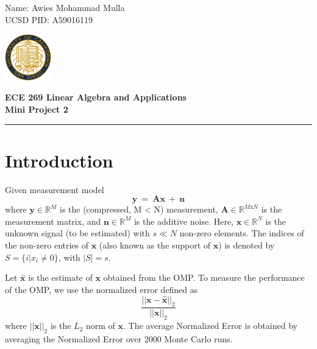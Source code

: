 \documentclass[11pt,letterpaper]{article}
\begin{document}
\pagestyle{plain}

\begin{flushleft}
Name: Awies Mohammad Mulla\\
UCSD PID: A59016119
\end{flushleft}

\begin{flushright}\vspace{-15mm}
\includegraphics[height=2cm]{logo.png}
\end{flushright}
 
\begin{center}\vspace{-1cm}
\textbf{\large ECE 269 Linear Algebra and Applications}\\
\textbf{\large Mini Project 2}\\
\end{center}

 
\rule{\linewidth}{0.1mm}

\bigskip
\bigskip

\section{Introduction}
Given measurement model
$$
\mathbf{y} \ = \ \mathbf{Ax} \ + \ \mathbf{n}
$$
where $ \mathbf{y} \in \mathbb{R}^{M}$ is the (compressed, M < N) measurement, $ \mathbf{A} \in \mathbb{R}^{M \text{x} N}$ is the measurement matrix, and $\mathbf{n} \in \mathbb{R}^{M}$ is the additive noise. Here, $\mathbf{x} \in \mathbb{R}^{N}$ is the unknown signal (to be estimated) with $s ≪ N$ non-zero elements. The indices of the non-zero entries of $\mathbf{x}$ (also known as the support of $\mathbf{x}$) is denoted by $S = \{ i |x_{i} \neq 0\}$, with $|S| = s$.

Let $\mathbf{\hat{x}}$ is the estimate of $\mathbf{x}$ obtained from the OMP. To measure the performance of the OMP, we use the normalized error defined as
$$
\frac{||\mathbf{x} - \mathbf{\hat{x}}||_{2}}{||\mathbf{x}||_2}
$$
where $||\mathbf{x}||_2$ is the $L_2$ norm of $\mathbf{x}$. The average Normalized Error is obtained by averaging the Normalized Error over 2000 Monte Carlo runs.
\end{document}
